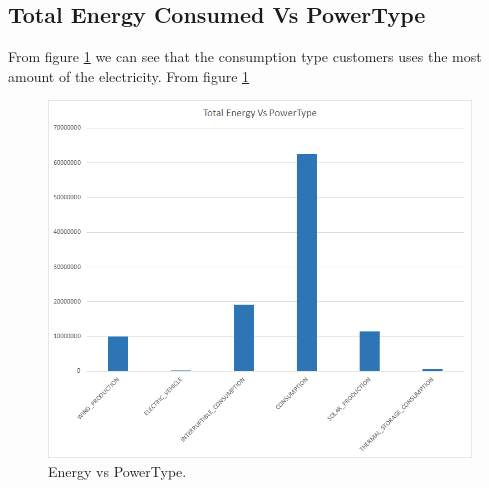 \subsection {Total Energy Consumed Vs PowerType}
From figure \ref{fig:energy-pt} we can see that the consumption type customers uses the most amount of the electricity.
From figure \ref{fig:energy-pt} 
\begin{figure}[h!]
  \includegraphics[width=\linewidth]{3-energy-vs-powertype.png}
  \caption{Energy vs PowerType.}
  \label{fig:energy-pt}
\end{figure}

